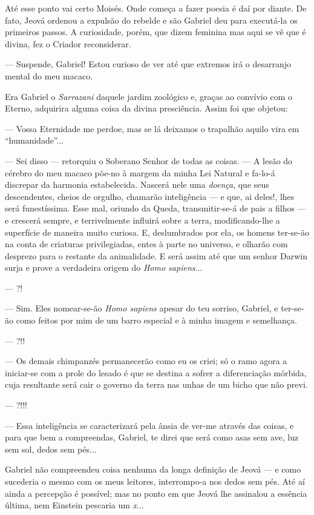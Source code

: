 Até esse ponto vai certo Moisés. Onde começa a fazer poesia é daí por
diante. De fato, Jeová ordenou a expulsão do rebelde e são Gabriel deu
para executá-la os primeiros passos. A curiosidade, porém, que dizem
feminina mas aqui se vê que é divina, fez o Criador reconsiderar.

--- Suspende, Gabriel! Estou curioso de ver até que extremos irá o
desarranjo mental do meu macaco.

Era Gabriel o \emph{Sarrazani} daquele jardim zoológico e, graças ao
convívio com o Eterno, adquirira alguma coisa da divina presciência.
Assim foi que objetou:

--- Vossa Eternidade me perdoe, mas se lá deixamos o trapalhão aquilo
vira em ``humanidade''...

--- Sei disso --- retorquiu o Soberano Senhor de todas as coisas. --- A
lesão do cérebro do meu macaco põe-no à margem da minha Lei Natural e
fa-lo-á discrepar da harmonia estabelecida. Nascerá nele uma
\emph{doença}, que seus descendentes, cheios de orgulho, chamarão
inteligência --- e que, ai deles!, lhes será funestíssima. Esse mal,
oriundo da Queda, transmitir-se-á de pais a filhos --- e crescerá
sempre, e terrivelmente influirá sobre a terra, modificando-lhe a
superfície de maneira muito curiosa. E, deslumbrados por ela, os homens
ter-se-ão na conta de criaturas privilegiadas, entes à parte no
universo, e olharão com desprezo para o restante da animalidade. E será
assim até que um senhor Darwin surja e prove a verdadeira origem do
\emph{Homo sapiens}...

--- ?!

--- Sim. Eles nomear-se-ão \emph{Homo sapiens} apesar do teu sorriso,
Gabriel, e ter-se-ão como feitos por mim de um barro especial e à minha
imagem e semelhança.

--- ?!!

--- Os demais chimpanzés permanecerão como eu os criei; só o ramo agora
a iniciar-se com a prole do lesado é que se destina a sofrer a
diferenciação mórbida, cuja resultante será cair o governo da terra nas
unhas de um bicho que não previ.

--- ?!!!

--- Essa inteligência se caracterizará pela ânsia de ver-me através das
coisas, e para que bem a compreendas, Gabriel, te direi que será como
asas sem ave, luz sem sol, dedos sem pés...

Gabriel não compreendeu coisa nenhuma da longa definição de Jeová --- e
como sucederia o mesmo com os meus leitores, interrompo-a nos dedos sem
pés. Até aí ainda a percepção é possível; mas no ponto em que Jeová lhe
assinalou a essência última, nem Einstein pescaria um \emph{x}...

